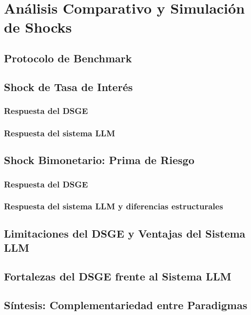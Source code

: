 
\chapter{Análisis Comparativo y Simulación de Shocks}
\label{chap:comparacion}

\section{Protocolo de Benchmark}
\label{sec:benchmark}

\section{Shock de Tasa de Interés}
\label{sec:shock-tasa}

\subsection{Respuesta del DSGE}
\label{subsec:resp-dsge-tasa}

\subsection{Respuesta del sistema LLM}
\label{subsec:resp-llm-tasa}

\section{Shock Bimonetario: Prima de Riesgo}
\label{sec:shock-bimonetario}

\subsection{Respuesta del DSGE}
\label{subsec:resp-dsge-bim}

\subsection{Respuesta del sistema LLM y diferencias estructurales}
\label{subsec:resp-llm-bim}

\section{Limitaciones del DSGE y Ventajas del Sistema LLM}
\label{sec:fallas-dsge}

\section{Fortalezas del DSGE frente al Sistema LLM}
\label{sec:ventajas-dsge}

\section{Síntesis: Complementariedad entre Paradigmas}
\label{sec:sintesis-comparativa}
